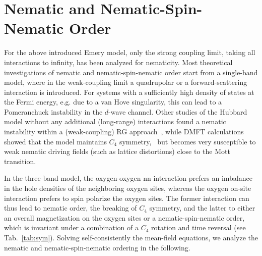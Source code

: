 \documentclass[prb, twocolumn,showpacs,preprintnumbers,amsmath,amssymb, floatfix]{revtex4}
\begin{document}
\section{Nematic and Nematic-Spin-Nematic Order}
\label{sec:static}
For the above introduced Emery model, only the strong coupling limit, taking all interactions to infinity, has been analyzed for nematicity.
Most theoretical investigations of nematic and nematic-spin-nematic order start from a single-band model, where in the weak-coupling limit a quadrupolar\cite{oganesyan:2001, wu:2007, kee:2003} or a forward-scattering interaction\cite{metzner:2003, yamase:2005} is introduced. For systems with a sufficiently high density of states at the Fermi energy, e.g. due to a van Hove singularity, this can lead to a Pomeranchuck instability in the $d$-wave channel. Other studies of the Hubbard model without any additional (long-range) interactions found a nematic instability within a (weak-coupling) RG approach~\cite{halboth:2000}, while DMFT calculations showed that the model maintains $C_{4}$ symmetry,~\cite{gull:2009, okamoto:2010} but becomes very susceptible to weak nematic driving fields (such as lattice distortions) close to the Mott transition.\cite{okamoto:2010}

In the three-band model,
the oxygen-oxygen nn interaction prefers an imbalance in the hole
densities of the neighboring oxygen sites, whereas the oxygen on-site
interaction prefers to spin polarize the oxygen sites. The former interaction
can thus lead to nematic order, the breaking of $C_4$ symmetry, and
the latter to either an overall magnetization on the oxygen sites or a
nematic-spin-nematic order, which is invariant under a combination of
a $C_4$ rotation and time reversal (see Tab.~\ref{tab:sym}). Solving self-consistently the
mean-field equations, we analyze the nematic and nematic-spin-nematic ordering in the following.
\end{document}

